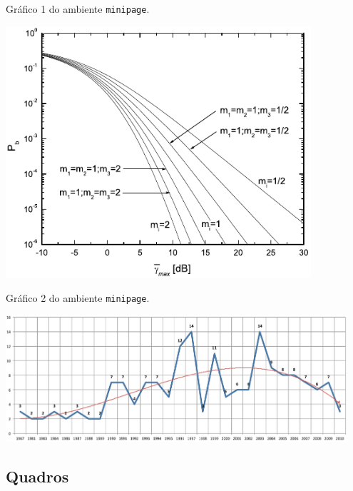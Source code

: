 \begin{graph}[htb]%
\begin{minipage}[t]{0.395\textwidth}%
\centering%
\captionsetup{width=0.85\textwidth}%
\caption{Gráfico 1 do ambiente \texttt{minipage}.}%
\label{gra:minipagegrafico1}%
\includegraphics[width=0.85\textwidth]{./CapituloExemplo/grafico1}%
\end{minipage}
\hfill
\begin{minipage}[t]{0.595\textwidth}%
\centering%
\captionsetup{width=0.95\textwidth}%
\caption{Gráfico 2 do ambiente \texttt{minipage}.}%
\label{gra:minipagegrafico2}%
\includegraphics[width=0.95\textwidth]{./CapituloExemplo/grafico2}%
\end{minipage}
\label{gra:minipagegraficos}
\end{graph}

\subsection{Quadros}\label{sec:quadros}

